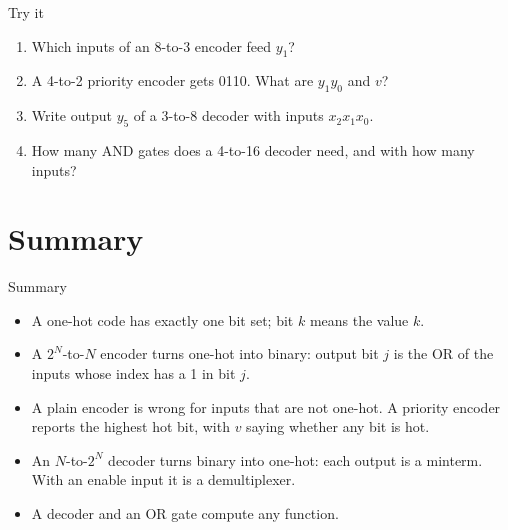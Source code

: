 \documentclass[10pt]{wosm-slides}
\begin{document}
\begin{frame}{Try it}
  \begin{enumerate}
    \item Which inputs of an 8-to-3 encoder feed $y_1$?\par
    \item A 4-to-2 priority encoder gets 0110. What are $y_1 y_0$ and $v$?\par
    \item Write output $y_5$ of a 3-to-8 decoder with inputs $x_2 x_1 x_0$.\par
    \item How many AND gates does a 4-to-16 decoder need, and with how many
      inputs?\par
  \end{enumerate}
\end{frame}

\section{Summary}

\begin{frame}{Summary}
  \begin{itemize}
    \item A one-hot code has exactly one bit set; bit $k$ means the value $k$.
    \item A $2^N$-to-$N$ encoder turns one-hot into binary: output bit $j$ is the OR
      of the inputs whose index has a 1 in bit $j$.
    \item A plain encoder is wrong for inputs that are not one-hot. A priority
      encoder reports the highest hot bit, with $v$ saying whether any bit is hot.
    \item An $N$-to-$2^N$ decoder turns binary into one-hot: each output is a
      minterm. With an enable input it is a demultiplexer.
    \item A decoder and an OR gate compute any function.
  \end{itemize}
\end{frame}
\end{document}
